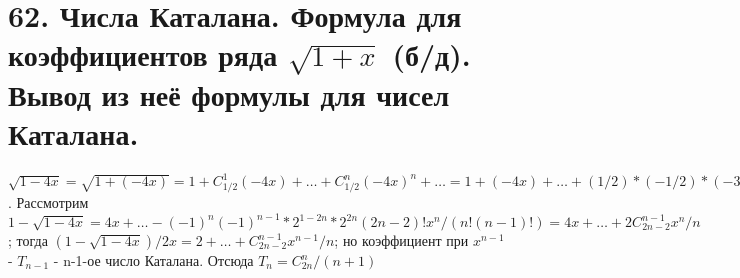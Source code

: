 \section*{62. Числа Каталана. Формула для коэффициентов ряда $\sqrt{1+x}$ (б/д). Вывод из неё формулы для чисел Каталана.}
$\sqrt{1-4x} = \sqrt{1+(-4x)} = 1 + C_{1/2}^1(-4x) + \dots + C_{1/2}^n(-4x)^n + \dots = 1 + (-4x) + \dots + (1/2)*(-1/2)*(-3/2)*\dots*((3-2n)/2)(-4x)^n/n! = 1 -4x + \dots + (-1)^{n-1}*2^{-n}*1*3*\dots*(2n-3)*2*4*\dots*(2n-2)(-4x)^n/(n!*2*4*\dots*(2n-2)) = 1 -4x + \dots + (-1)^{n-1}*2^{-n}*2^{1-n}(2n-2)!(-4x)^n/(n!(n-1)!)$. Рассмотрим $1-\sqrt{1-4x} = 4x + \dots - (-1)^n(-1)^{n-1}*2^{1-2n}*2^{2n}(2n-2)!x^n/(n!(n-1)!) = 4x + \dots + 2C_{2n-2}^{n-1}x^n/n$; тогда $(1-\sqrt{1-4x})/2x = 2 + \dots + C_{2n-2}^{n-1}x^{n-1}/n $; но коэффициент при $x^{n-1}$ - $T_{n-1}$ - n-1-ое число Каталана. Отсюда $T_n = C_{2n}^n/(n+1)$